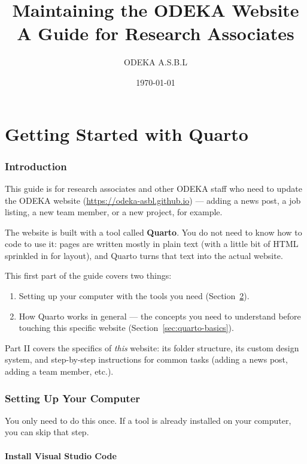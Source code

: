 \documentclass[11pt]{article}
\title{\color{odekared}\Huge Maintaining the ODEKA Website\\[0.3em]
\normalsize\color{black} A Guide for Research Associates}
\author{ODEKA A.S.B.L}
\date{\today}
\newcommand{\term}[1]{\textbf{#1}}
\begin{document}
\maketitle
\tableofcontents

\part{Getting Started with Quarto}

\section{Introduction}

This guide is for research associates and other ODEKA staff who need to update
the ODEKA website (\url{https://odeka-asbl.github.io}) --- adding a news post,
a job listing, a new team member, or a new project, for example.

The website is built with a tool called \term{Quarto}. You do not need to know
how to code to use it: pages are written mostly in plain text (with a little bit
of HTML sprinkled in for layout), and Quarto turns that text into the actual
website.

This first part of the guide covers two things:

\begin{enumerate}
    \item Setting up your computer with the tools you need (Section~\ref{sec:setup}).
    \item How Quarto works in general --- the concepts you need to understand
    before touching this specific website (Section~\ref{sec:quarto-basics}).
\end{enumerate}

Part II covers the specifics of \emph{this} website: its folder
structure, its custom design system, and step-by-step instructions for
common tasks (adding a news post, adding a team member, etc.).

\section{Setting Up Your Computer}
\label{sec:setup}

You only need to do this once. If a tool is already installed on your
computer, you can skip that step.

\subsection{Install Visual Studio Code}
\end{document}
